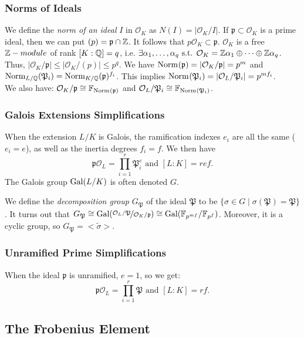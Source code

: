 \subsubsection{Norms of Ideals}
We define the \textit{norm of an ideal} $I$ in $\mathcal{O}_K$ as $N(I)=|\mathcal{O}_K/I|$.
If $\mathfrak{p} \subset \mathcal{O}_K$ is a prime ideal, then we can put $(p)=\mathfrak{p} \cap \Z$.
It follows that $p\mathcal{O}_K \subset \mathfrak{p}$.
$\mathcal{O}_K$ is a free $\Z-module$ of rank $[K:\Q]=q$, i.e. $\exists \alpha_1,\dots,\alpha_q \text{ s.t. } \mathcal{O}_K=\Z \alpha_1 \oplus \cdots \oplus \Z \alpha_q$.
Thus, $|\mathcal{O}_K/\mathfrak{p}| \leq |\mathcal{O}_K/(p)| \leq p^q$.
We have $\Norm{\mathfrak{p}} = |\mathcal{O}_K/\mathfrak{p}|=p^m$ and $\Norm[L/\Q]{\mathfrak{P}_i} = \Norm[K/\Q]{\mathfrak{p}}^{f_i}$.
This implies $\Norm{\mathfrak{P}_i} = |\mathcal{O}_L/\mathfrak{P}_i| = p^{mf_i}$.\\
We also have: 
$\mathcal{O}_K/\mathfrak{p} \cong \mathbb{F}_{\Norm{\mathfrak{p}}}$ and $\mathcal{O}_L/\mathfrak{P}_i \cong \mathbb{F}_{\Norm{\mathfrak{P}_i}}$.

\subsubsection{Galois Extensions Simplifications}
When the extension $L/K$ is Galois, the ramification indexes $e_i$ are all the same ($e_i=e$), as well as the inertia degrees $f_i=f$.
We then have
$$
\mathfrak{p}\mathcal{O}_L = \prod_{i=1}^r \mathfrak{P}_i^{e}
\text{ and } [L:K] = ref.
$$
The Galois group $\Gal{L/K}$ is often denoted $G$.

We define the \textit{decomposition group} $G_{\mathfrak{P}}$ of the ideal $\mathfrak{P}$ to be $\{\sigma \in G \mid \sigma(\mathfrak{P})=\mathfrak{P} \}$.
It turns out that 
$G_{\mathfrak{P}} 
\cong \Gal{\nicefrac{\mathcal{O}_L/\mathfrak{P}}{\mathcal{O}_K/\mathfrak{p}}}
\cong \Gal{ \mathbb{F}_{p^{mf}}/\mathbb{F}_{p^{f}}}$.
Moreover, it is a cyclic group, so $G_{\mathfrak{P}} = <\tilde{\sigma}>$.

\subsubsection{Unramified Prime Simplifications}
When the ideal $\mathfrak{p}$ is unramified, $e=1$, so we get:
$$
\mathfrak{p}\mathcal{O}_L 
= \prod_{i=1}^r \mathfrak{P} \text{ and } [L:K] = rf.
$$

\subsection{The Frobenius Element}
